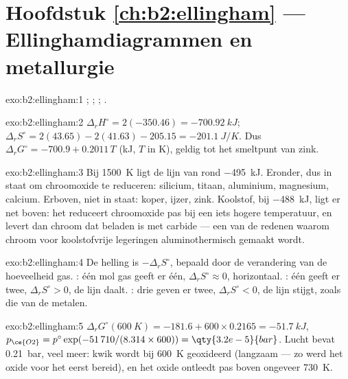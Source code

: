 \section*{Hoofdstuk \ref{ch:b2:ellingham} --- Ellinghamdiagrammen en metallurgie}

\begin{solution}{exo:b2:ellingham:1}
; ; ;
.
\end{solution}

\begin{solution}{exo:b2:ellingham:2}
$\Delta_r H^\circ = 2(-350.46) = \qty{-700.92}{kJ}$; $\Delta_r S^\circ = 2(43.65)
- 2(41.63) - 205.15 = \qty{-201.1}{J/K}$. Dus $\Delta_r G^\circ = -700.9 +
0.2011\,T$ (\unit{kJ}, $T$ in \unit{K}), geldig tot het smeltpunt van zink.
\end{solution}

\begin{solution}{exo:b2:ellingham:3}
Bij \qty{1500}{K} ligt de lijn van  rond \qty{-495}{kJ}. Eronder, dus
in staat om chroomoxide te reduceren: silicium, titaan, aluminium, magnesium,
calcium. Erboven, niet in staat: koper, ijzer, zink. Koolstof, bij \qty{-488}{kJ}, ligt
er net boven: het reduceert chroomoxide pas bij een iets hogere temperatuur,
en levert dan chroom dat beladen is met carbide --- een van de redenen waarom chroom voor
koolstofvrije legeringen aluminothermisch gemaakt wordt.
\end{solution}

\begin{solution}{exo:b2:ellingham:4}
De helling is $-\Delta_r S^\circ$, bepaald door de verandering van de hoeveelheid gas.
: één mol gas geeft er één, $\Delta_r S^\circ \approx 0$,
horizontaal. : één geeft er twee, $\Delta_r S^\circ > 0$, de
lijn daalt. : drie geven er twee, $\Delta_r S^\circ < 0$, de
lijn stijgt, zoals die van de metalen.
\end{solution}

\begin{solution}{exo:b2:ellingham:5}
$\Delta_r G^\circ(\qty{600}{K}) = -181.6 + 600 \times 0.2165 = \qty{-51.7}{kJ}$,
$p_{\ce{O2}} = p^\circ\exp(-51\,710/(8.314 \times 600)) = \qty{3.2e-5}{bar}$. Lucht
bevat \qty{0.21}{bar}, veel meer: kwik wordt bij \qty{600}{K} geoxideerd (langzaam
--- zo werd het oxide voor het eerst bereid), en het oxide ontleedt pas
boven ongeveer \qty{730}{K}.
\end{solution}

